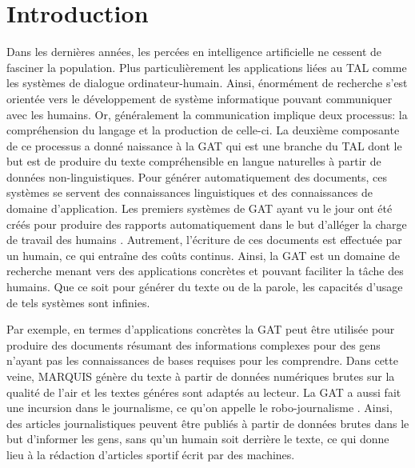 
\chapter*{Introduction}


Dans les dernières années, les percées en intelligence artificielle ne cessent de fasciner la population. Plus particulièrement les applications liées au \ac{TAL} comme les systèmes de dialogue ordinateur-humain. Ainsi, énormément de recherche s'est orientée vers le développement de système informatique pouvant communiquer avec les humains. Or, généralement la communication implique deux processus: la compréhension du langage et la production de celle-ci. La deuxième composante de ce processus a donné naissance à la \ac{GAT} qui est une branche du \ac{TAL} dont le but est de produire du texte compréhensible en langue naturelles à partir de données non-linguistiques. Pour générer automatiquement des documents, ces systèmes se servent des connaissances linguistiques et des connaissances de domaine d'application. Les premiers systèmes de \ac{GAT} ayant vu le jour ont été créés pour produire des rapports automatiquement dans le but d'alléger la charge de travail des humains \citep{ReiterBuildingNaturalLanguage2000}. Autrement, l'écriture de ces documents est effectuée par un humain, ce qui entraîne des coûts continus. Ainsi, la \ac{GAT} est un domaine de recherche menant vers des applications concrètes et pouvant faciliter la tâche des humains. Que ce soit pour générer du texte ou de la parole, les capacités d'usage de tels systèmes sont infinies.

Par exemple, en termes d'applications concrètes la \ac{GAT} peut être utilisée pour produire des documents résumant des informations complexes pour des gens n'ayant pas les connaissances de bases requises pour les comprendre. Dans cette veine, MARQUIS \citep{WannerMARQUISGENERATIONUSERTAILORED2010} génère du texte à partir de données numériques brutes sur la qualité de l'air et les textes généres sont adaptés au lecteur. La \ac{GAT} a aussi fait une incursion dans le journalisme, ce qu'on appelle le robo-journalisme \citep{W17-3513}. Ainsi, des articles journalistiques peuvent être publiés à partir de données brutes dans le but d'informer les gens, sans qu'un humain soit derrière le texte, ce qui donne lieu à la rédaction d'articles sportif écrit par des machines.

